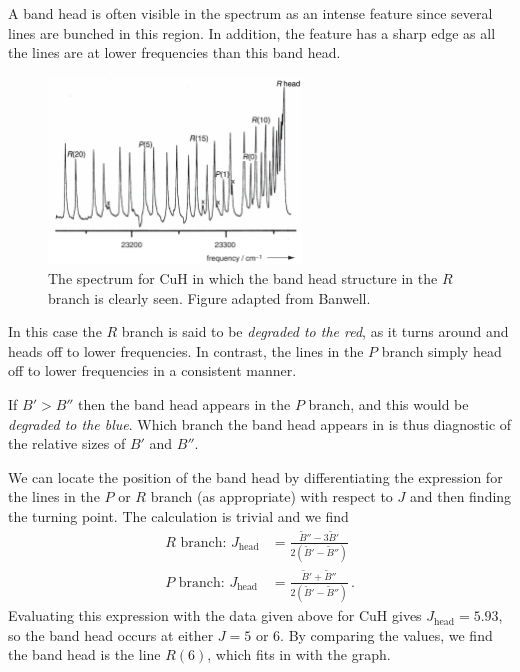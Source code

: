 \documentclass{article}
\theoremstyle{plain}\theoremheaderfont{\normalfont\itshape}\theorembodyfont{\rmfamily}\theoremseparator{.}\newtheorem*{rem}{Remark}\newtheorem*{ex}{Example}\newtheorem*{proof}{Proof}\newtheorem*{altp}{Alternative proof}
\theoremstyle{plain}\theoremheaderfont{\normalfont\bfseries}\theorembodyfont{\rmfamily}\theoremseparator{.}\newtheorem{thm}{Theorem}[section]\newtheorem{lem}[thm]{Lemma}\newtheorem{prop}[thm]{Proposition}\newtheorem*{cor}{Corollary}\newtheorem{defn}[thm]{Definition}\newtheorem{clm}[thm]{Claim}\newtheorem{clminproof}{Claim}\newtheorem{pos}{Postulate}[section]
\theoremstyle{break}\theoremheaderfont{\normalfont\itshape}\theorembodyfont{\rmfamily}\theoremseparator{.\medskip}\newtheorem*{proofskip}{Proof}\newtheorem*{exs}{Examples}\newtheorem*{rems}{Remarks}
\theoremstyle{break}\theoremheaderfont{\normalfont\bfseries}\theorembodyfont{\rmfamily}\theoremseparator{.\medskip}\newtheorem{lemskip}[thm]{Lemma}\newtheorem{defnskip}[thm]{Definition}\newtheorem{propskip}[thm]{Proposition}\newtheorem{thmskip}[thm]{Theorem}
\numberwithin{equation}{section}
\begin{document}
    A band head is often visible in the spectrum as an intense feature since several lines are bunched in this region. In addition, the feature has a sharp edge as all the lines are at lower frequencies than this band head.

    \begin{figure}
        \centering
        \includegraphics[width=0.6\textwidth]{band_head.png}
        \caption{The spectrum for \(\mathrm{CuH}\) in which the band head structure in the \(R\) branch is clearly seen. Figure adapted from Banwell.}
    \end{figure}

    In this case the \(R\) branch is said to be \textit{degraded to the red}, as it turns around and heads off to lower frequencies. In contrast, the lines in the \(P\) branch simply head off to lower frequencies in a consistent manner.

    If \(B'>B''\) then the band head appears in the \(P\) branch, and this would be \textit{degraded to the blue}. Which branch the band head appears in is thus diagnostic of the relative sizes of
    \(B'\) and \(B''\).

    We can locate the position of the band head by differentiating the expression for the lines in the \(P\) or \(R\) branch (as appropriate) with respect to \(J\) and then finding the turning point. The calculation is trivial and we find
    \begin{align}
        R\text{ branch: }J_{\text{head}}&=\frac{\tilde{B}''-3\tilde{B}'}{2(\tilde{B}'-\tilde{B}'')}\\
        P\text{ branch: }J_{\text{head}}&=\frac{\tilde{B}'+\tilde{B}''}{2(\tilde{B}'-\tilde{B}'')}\,.
    \end{align}
    Evaluating this expression with the data given above for \(\mathrm{CuH}\) gives \(J_{\text{head}}=5.93\), so the band head occurs at either \(J=5\) or \(6\). By comparing the values, we find the band head is the line \(R(6)\), which fits in with the graph.
\end{document}
